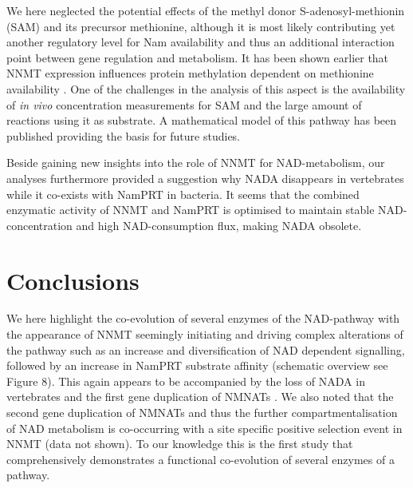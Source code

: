 We here neglected the potential effects of the methyl donor S-adenosyl-methionin (SAM) and its precursor methionine, although it is most likely contributing yet another regulatory level for Nam availability and thus an additional interaction point between gene regulation and metabolism. It has been shown earlier that NNMT expression influences protein methylation dependent on methionine availability \cite{Ulanovskaya2013}. One of the challenges in the analysis of this aspect is the availability of \textit{in vivo} concentration measurements for SAM and the large amount of reactions using it as substrate.  A mathematical model of this pathway has  been published \cite{PMID14637052}  providing the basis for future studies.

Beside gaining new insights into the role of NNMT for NAD-metabolism, our analyses furthermore provided a suggestion why NADA disappears in vertebrates while it co-exists with NamPRT in bacteria. It seems that the combined enzymatic activity of NNMT and NamPRT is optimised to maintain stable NAD-concentration and high NAD-consumption flux, making NADA obsolete.

\section{Conclusions}

We here highlight the co-evolution of several enzymes of the NAD-pathway with the appearance of NNMT seemingly initiating and driving complex alterations of the pathway such as an increase and diversification of NAD dependent signalling, followed by an increase in NamPRT substrate affinity (schematic overview see Figure 8). This again appears to be accompanied by the loss of NADA in vertebrates and the first gene duplication of NMNATs \cite{Lau2010}. We also noted that the second gene duplication of NMNATs and thus the further compartmentalisation of NAD metabolism is co-occurring with a site specific positive selection event in NNMT (data not shown). To our knowledge this is the first study that comprehensively demonstrates a functional co-evolution of several enzymes of a pathway.